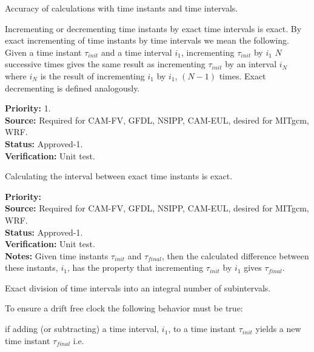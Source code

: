 \label{req:precision}
Accuracy of calculations with time instants and time intervals.

Incrementing or decrementing time instants by exact time intervals is exact.
By exact incrementing of time instants by time intervals we mean the following.
Given a time instant $\tau_{init}$ and a time interval $i_{1}$,
incrementing $\tau_{init}$ by $i_{1}$ $N$ successive times gives the same
result as incrementing $\tau_{init}$ by an interval $i_{N}$ where $i_{N}$
is the result of incrementing $i_{1}$ by $i_{1}$, $(N-1)$ times.  Exact
decrementing is defined analogously.
\begin{reqlist}
{\bf Priority:} 1. \\
{\bf Source:} Required for CAM-FV, GFDL, NSIPP, CAM-EUL, desired for MITgcm, WRF. \\
{\bf Status:} Approved-1. \\
{\bf Verification:} Unit test.  
\end{reqlist}

Calculating the interval between exact time instants is exact.
\begin{reqlist}
{\bf Priority:} \\
{\bf Source:} Required for CAM-FV, GFDL, NSIPP, CAM-EUL, desired for MITgcm, WRF. \\
{\bf Status:} Approved-1. \\
{\bf Verification:} Unit test. \\
{\bf Notes:} 
Given time instants $\tau_{init}$ and $\tau_{final}$, then the calculated
difference between these instants, $i_{1}$, has the property that 
incrementing $\tau_{init}$ by $i_{1}$ gives $\tau_{final}$.
\end{reqlist}

Exact division of time intervals into an integral number of subintervals.

To ensure a drift free clock the following behavior must be true:

if adding (or subtracting) a time interval, $i_{1}$, to a time 
instant $\tau_{init}$ yields a new time instant $\tau_{final}$ i.e.


